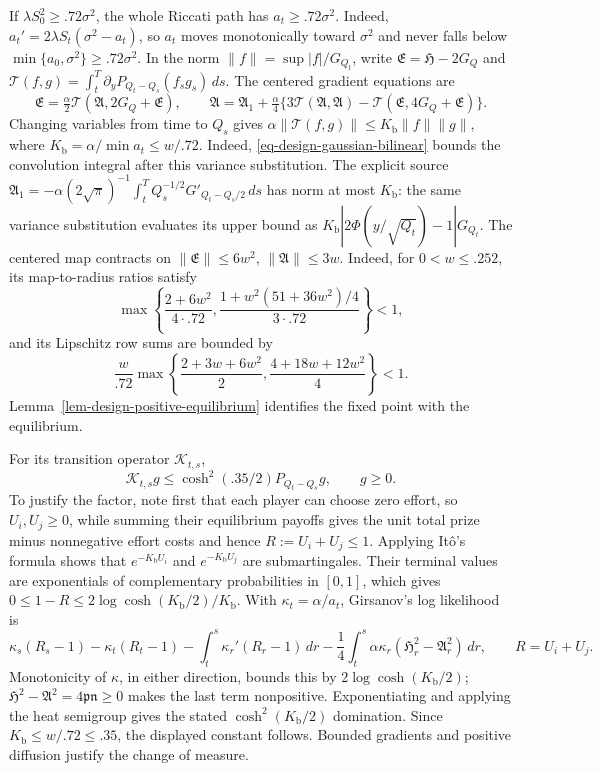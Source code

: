 \documentclass[mnsc]{informs3}
\begin{document}
\begin{APPENDICES}
{If $\lambda S_0^2\geq.72\sigma^2$, the whole Riccati path has
$a_t\geq.72\sigma^2$. Indeed,
$a_t'=2\lambda S_t(\sigma^2-a_t)$, so $a_t$ moves monotonically toward
$\sigma^2$ and never falls below
$\min\{a_0,\sigma^2\}\geq.72\sigma^2$. In the norm
$\|f\|=\sup|f|/G_{Q_t}$,
write ${\mathfrak E}={\mathfrak H}-2G_Q$ and
$\mathcal T(f,g)=\int_t^T\partial_yP_{Q_t-Q_s}(f_sg_s)\,ds$.
The centered gradient equations are
\[
{\mathfrak E}=\tfrac\alpha2\mathcal T({\mathfrak A},2G_Q+{\mathfrak E}),\qquad
{\mathfrak A}={\mathfrak A}_1+\tfrac\alpha4\{3\mathcal T({\mathfrak A},{\mathfrak A})-\mathcal T({\mathfrak E},4G_Q+{\mathfrak E})\}.
\]
Changing variables from time to $Q_s$ gives
$\alpha\|\mathcal T(f,g)\|\leq {K_{\mathrm b}}\|f\|\|g\|$,
where ${K_{\mathrm b}}=\alpha/\min a_t\leq w/.72$.
Indeed, \eqref{eq-design-gaussian-bilinear} bounds the convolution
integral after this variance substitution.
The explicit source
${\mathfrak A}_1=-\alpha(2\sqrt\pi)^{-1}\int_t^TQ_s^{-1/2}G'_{Q_t-Q_s/2}\,ds$
has norm at most ${K_{\mathrm b}}$: the same variance substitution evaluates its
upper bound as ${K_{\mathrm b}}|2\Phi(y/\sqrt{Q_t})-1|G_{Q_t}$.
The centered map contracts on $\|{\mathfrak E}\|\leq6w^2$, $\|{\mathfrak A}\|\leq3w$.
Indeed, for $0<w\leq.252$, its map-to-radius ratios satisfy
\[
\max\left\{\frac{2+6w^2}{4\cdot.72},
\frac{1+w^2(51+36w^2)/4}{3\cdot.72}\right\}<1,
\]
and its Lipschitz row sums are bounded by
\[
\frac{w}{.72}\max\left\{\frac{2+3w+6w^2}{2},
\frac{4+18w+12w^2}{4}\right\}<1.
\]
Lemma~\ref{lem-design-positive-equilibrium} identifies the fixed point
with the equilibrium.

For its transition operator $\mathcal K_{t,s}$,
\[
\mathcal K_{t,s}g\leq\cosh^2(.35/2)P_{Q_t-Q_s}g,\qquad g\geq0.
\]
To justify the factor, note first that each player can choose zero effort,
so $U_i,U_j\geq0$, while summing their equilibrium payoffs gives the
unit total prize minus nonnegative effort costs and hence
$R:=U_i+U_j\leq1$. Applying It\^o's formula shows that
$e^{-{K_{\mathrm b}}U_i}$ and $e^{-{K_{\mathrm b}}U_j}$ are submartingales. Their terminal values are
exponentials of complementary probabilities in $[0,1]$, which gives
$0\leq1-R\leq2\log\cosh({K_{\mathrm b}}/2)/{K_{\mathrm b}}$.
With $\kappa_t=\alpha/a_t$, Girsanov's log likelihood is
\[
\kappa_s(R_s-1)-\kappa_t(R_t-1)
-\int_t^s\kappa_r'(R_r-1)\,dr
-\frac14\int_t^s\alpha\kappa_r({\mathfrak H}_r^2-{\mathfrak A}_r^2)\,dr,
\qquad R=U_i+U_j.
\]
Monotonicity of $\kappa$, in either direction, bounds this by
$2\log\cosh({K_{\mathrm b}}/2)$; ${\mathfrak H}^2-{\mathfrak A}^2=4{\mathfrak p}{\mathfrak n}\geq0$ makes the last term nonpositive.
Exponentiating and applying the heat semigroup gives the stated
$\cosh^2({K_{\mathrm b}}/2)$ domination. Since ${K_{\mathrm b}}\leq w/.72\leq.35$, the displayed
constant follows. Bounded gradients and positive diffusion justify the
change of measure.

}
\end{APPENDICES}
\end{document}
